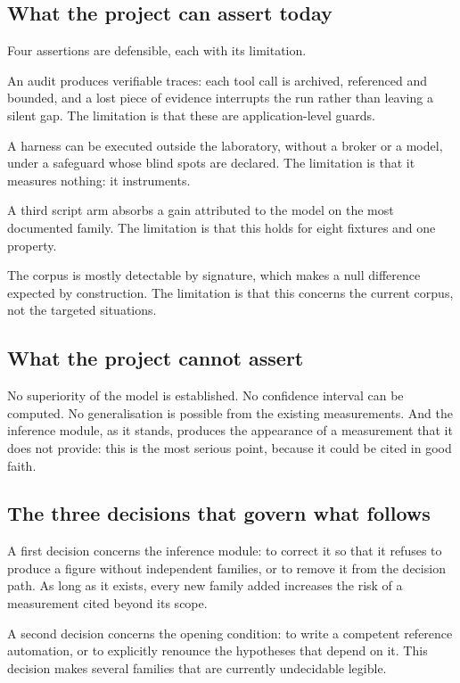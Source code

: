\subsection{What the project can assert today}

Four assertions are defensible, each with its limitation.

An audit produces verifiable traces: each tool call is archived, referenced and bounded, and a lost piece of evidence interrupts the run rather than leaving a silent gap. The limitation is that these are application-level guards.

A harness can be executed outside the laboratory, without a broker or a model, under a safeguard whose blind spots are declared. The limitation is that it measures nothing: it instruments.

A third script arm absorbs a gain attributed to the model on the most documented family. The limitation is that this holds for eight fixtures and one property.

The corpus is mostly detectable by signature, which makes a null difference expected by construction. The limitation is that this concerns the current corpus, not the targeted situations.

\subsection{What the project cannot assert}

No superiority of the model is established. No confidence interval can be computed. No generalisation is possible from the existing measurements. And the inference module, as it stands, produces the appearance of a measurement that it does not provide: this is the most serious point, because it could be cited in good faith.

\subsection{The three decisions that govern what follows}

A first decision concerns the inference module: to correct it so that it refuses to produce a figure without independent families, or to remove it from the decision path. As long as it exists, every new family added increases the risk of a measurement cited beyond its scope.

A second decision concerns the opening condition: to write a competent reference automation, or to explicitly renounce the hypotheses that depend on it. This decision makes several families that are currently undecidable legible.

